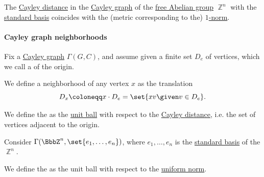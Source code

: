\begin{proposition}\label{thm:cayley_distance_integer_lattice}
  The \hyperref[def:cayley_distance]{Cayley distance} in the \hyperref[def:cayley_graph]{Cayley graph} of the \hyperref[def:free_abelian_group]{free Abelian group} \( \BbbZ^n \) with the \hyperref[def:coordinate_space]{standard basis} coincides with the (metric corresponding to the) \hyperref[def:p_norm]{\( 1 \)-norm}.
\end{proposition}

\paragraph{Cayley graph neighborhoods}

\begin{definition}\label{def:cayley_graph_neighborhood}
  Fix a \hyperref[def:cayley_graph]{Cayley graph} \( \Gamma(G, C) \), and assume given a finite set \( D_e \) of vertices, which we call a  of the origin.

  We define a neighborhood of any vertex \( x \) as the translation
  \begin{equation*}
    D_x \coloneqq x \cdot D_e = \set{ xv \given v \in D_e }.
  \end{equation*}

  \begin{thmenum}
     We define the  as the \hyperref[def:metric_space/ball]{unit ball} with respect to the \hyperref[def:cayley_distance]{Cayley distance}, i.e. the set of vertices adjacent to the origin.

     Consider \( \Gamma(\BbbZ^n, \set{ e_1, \ldots, e_n }) \), where \( e_1, \ldots, e_n \) is the \hyperref[def:coordinate_space]{standard basis} of the \hyperref[def:free_abelian_group]{\( \BbbZ^n \)}.

    We define the  as the unit ball with respect to the \hyperref[def:p_norm]{uniform norm}.
  \end{thmenum}
\end{definition}

